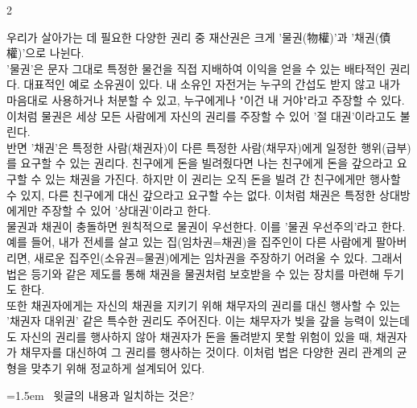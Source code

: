 \documentclass[10pt, a4paper]{article}
\begin{document}
\begin{multicols}{2}
\begin{passagebox}
\noindent{}우리가 살아가는 데 필요한 다양한 권리 중 재산권은 크게 '물권(物權)'과 '채권(債權)'으로 나뉜다. \\
'물권'은 문자 그대로 특정한 물건을 직접 지배하여 이익을 얻을 수 있는 배타적인 권리다. 대표적인 예로 소유권이 있다. 내 소유인 자전거는 누구의 간섭도 받지 않고 내가 마음대로 사용하거나 처분할 수 있고, 누구에게나 "이건 내 거야"라고 주장할 수 있다. 이처럼 물권은 세상 모든 사람에게 자신의 권리를 주장할 수 있어 '절 대권'이라고도 불린다. \\
반면 '채권'은 특정한 사람(채권자)이 다른 특정한 사람(채무자)에게 일정한 행위(급부)를 요구할 수 있는 권리다. 친구에게 돈을 빌려줬다면 나는 친구에게 돈을 갚으라고 요구할 수 있는 채권을 가진다. 하지만 이 권리는 오직 돈을 빌려 간 친구에게만 행사할 수 있지, 다른 친구에게 대신 갚으라고 요구할 수는 없다. 이처럼 채권은 특정한 상대방에게만 주장할 수 있어 '상대권'이라고 한다.
\\[0.5em]
물권과 채권이 충돌하면 원칙적으로 물권이 우선한다. 이를 '물권 우선주의'라고 한다. 예를 들어, 내가 전세를 살고 있는 집(임차권=채권)을 집주인이 다른 사람에게 팔아버리면, 새로운 집주인(소유권=물권)에게는 임차권을 주장하기 어려울 수 있다. 그래서 법은 등기와 같은 제도를 통해 채권을 물권처럼 보호받을 수 있는 장치를 마련해 두기도 한다.
\\[0.5em]
또한 채권자에게는 자신의 채권을 지키기 위해 채무자의 권리를 대신 행사할 수 있는 '채권자 대위권' 같은 특수한 권리도 주어진다. 이는 채무자가 빚을 갚을 능력이 있는데도 자신의 권리를 행사하지 않아 채권자가 돈을 돌려받지 못할 위험이 있을 때, 채권자가 채무자를 대신하여 그 권리를 행사하는 것이다. 이처럼 법은 다양한 권리 관계의 균형을 맞추기 위해 정교하게 설계되어 있다.
\end{passagebox}
\vspace{1mm}

\noindent\begin{minipage}{\columnwidth}
\vspace{2mm}
{\hangindent=1.5em  ~윗글의 내용과 일치하는 것은?\par}


\end{minipage}
\end{multicols}
\end{document}
